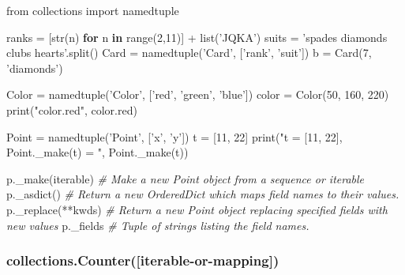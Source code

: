 \documentclass[11pt]{article}
\newenvironment{Shaded}{}{}
\newcommand{\KeywordTok}[1]{\textcolor[rgb]{0.00,0.44,0.13}{\textbf{{#1}}}}
\newcommand{\DecValTok}[1]{\textcolor[rgb]{0.25,0.63,0.44}{{#1}}}
\newcommand{\StringTok}[1]{\textcolor[rgb]{0.25,0.44,0.63}{{#1}}}
\newcommand{\CommentTok}[1]{\textcolor[rgb]{0.38,0.63,0.69}{\textit{{#1}}}}
\newcommand{\NormalTok}[1]{{#1}}
\newcommand{\ImportTok}[1]{{#1}}
\newcommand{\ControlFlowTok}[1]{\textcolor[rgb]{0.00,0.44,0.13}{\textbf{{#1}}}}
\newcommand{\OperatorTok}[1]{\textcolor[rgb]{0.40,0.40,0.40}{{#1}}}
\newcommand{\BuiltInTok}[1]{{#1}}
\begin{document}
\begin{Shaded}
\begin{Highlighting}[]
\ImportTok{from}\NormalTok{ collections }\ImportTok{import}\NormalTok{ namedtuple}

\NormalTok{ranks }\OperatorTok{=}\NormalTok{ [}\BuiltInTok{str}\NormalTok{(n) }\ControlFlowTok{for}\NormalTok{ n }\KeywordTok{in} \BuiltInTok{range}\NormalTok{(}\DecValTok{2}\NormalTok{,}\DecValTok{11}\NormalTok{)] }\OperatorTok{+} \BuiltInTok{list}\NormalTok{(}\StringTok{'JQKA'}\NormalTok{)}
\NormalTok{suits }\OperatorTok{=} \StringTok{'spades diamonds clubs hearts'}\NormalTok{.split()  }
\NormalTok{Card }\OperatorTok{=}\NormalTok{ namedtuple(}\StringTok{'Card'}\NormalTok{, [}\StringTok{'rank'}\NormalTok{, }\StringTok{'suit'}\NormalTok{])}
\NormalTok{b }\OperatorTok{=}\NormalTok{ Card(}\DecValTok{7}\NormalTok{, }\StringTok{'diamonds'}\NormalTok{)}

\NormalTok{Color }\OperatorTok{=}\NormalTok{ namedtuple(}\StringTok{'Color'}\NormalTok{, [}\StringTok{'red'}\NormalTok{, }\StringTok{'green'}\NormalTok{, }\StringTok{'blue'}\NormalTok{])}
\NormalTok{color }\OperatorTok{=}\NormalTok{ Color(}\DecValTok{50}\NormalTok{, }\DecValTok{160}\NormalTok{, }\DecValTok{220}\NormalTok{)}
\BuiltInTok{print}\NormalTok{(}\StringTok{"color.red"}\NormalTok{, color.red)}

\NormalTok{Point }\OperatorTok{=}\NormalTok{ namedtuple(}\StringTok{'Point'}\NormalTok{, [}\StringTok{'x'}\NormalTok{, }\StringTok{'y'}\NormalTok{])}
\NormalTok{t }\OperatorTok{=}\NormalTok{ [}\DecValTok{11}\NormalTok{, }\DecValTok{22}\NormalTok{]}
\BuiltInTok{print}\NormalTok{(}\StringTok{"t = [11, 22], Point._make(t) = "}\NormalTok{, Point._make(t))}

\NormalTok{p._make(iterable) }\CommentTok{# Make a new Point object from a sequence or iterable}
\NormalTok{p._asdict() }\CommentTok{# Return a new OrderedDict which maps field names to their values.}
\NormalTok{p._replace(}\OperatorTok{**}\NormalTok{kwds) }\CommentTok{# Return a new Point object replacing specified fields with new values}
\NormalTok{p._fields }\CommentTok{# Tuple of strings listing the field names. }
\end{Highlighting}
\end{Shaded}

\subsubsection{collections.Counter({[}iterable-or-mapping{]})}\label{collections.counteriterable-or-mapping}
\end{document}
